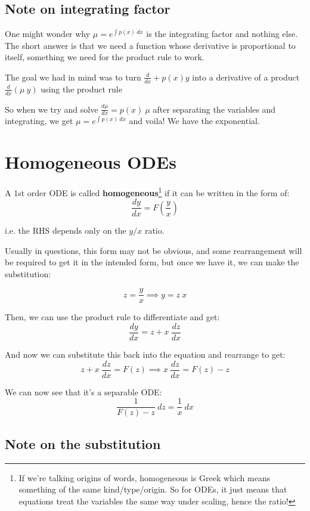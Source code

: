 \subsection{Note on integrating factor}

One might wonder why $\mu = e^{\int p(x) \ dx} $ is the integrating factor and nothing else. The short answer is that we need a function whose derivative is proportional to itself, something we need for the product rule to work. 

The goal we had in mind was to turn $\frac{d}{dx} + p(x) y$ into a derivative of a product $\frac{d}{dx} (\mu \ y)$ using the product rule

So when we try and solve $\frac{d\mu}{dx} = p(x) \ \mu$ after separating the variables and integrating, we get $\mu = e^{\int p(x) \ dx}$ and voila! We have the exponential. 

\section{Homogeneous ODEs}

A 1st order ODE is called \textbf{homogeneous}\footnote{If we're talking origins of words, homogeneous is Greek which means something of the same kind/type/origin. So for ODEs, it just means that equations treat the variables the same way under scaling, hence the ratio!} if it can be written in the form of: 
$$ 
\frac{dy}{dx}= F \left (\frac{y}{x} \right)
$$

i.e. the RHS depends only on the $y/x$ ratio.

Usually in questions, this form may not be obvious, and some rearrangement will be required to get it in the intended form, but once we have it, we can make the substitution: 

$$
z = \frac{y}{x} \implies y = z \ x 
$$

Then, we can use the product rule to differentiate and get: 
$$
\frac{dy}{dx} = z + x \ \frac{dz}{dx}
$$

And now we can substitute this back into the equation and rearrange to get: 
$$
z + x \ \frac{dz}{dx} = F(z)  \implies x \ \frac{dz}{dx} = F(z) - z
$$

We can now see that it's a separable ODE: 
$$
\frac{1}{F(z) - z} \ dz = \frac{1}{x} \ dx 
$$

\subsection{Note on the substitution}

